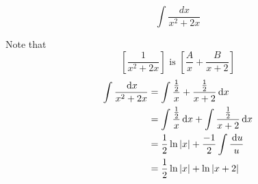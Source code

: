 \begin{ex}
  \[ \int \frac{dx}{x^2+2x} \]
  \begin{sol}
    Note that
    \[ \left[ \frac{1}{x^2+2x}\right] \text{ is }
    \left[\frac{A}{x}+\frac{B}{x+2}\right] \]
    \begin{align*}
      \int \frac{\,\mathrm{d} x}{x^2+2x} &=
      \int \frac{\frac{1}{2}}{x}+\frac{\frac{1}{2}}{x+2} \,\mathrm{d} x \\
      &= \int \frac{\frac{1}{2}}{x} \,\mathrm{d} x+\int\frac{\frac{1}{2}}{x+2} \,\mathrm{d} x \\
      &= \frac{1}{2}\ln{|x|}+\frac{-1}{2}\int\frac{\,\mathrm{d} u}{u} \\
      &= \frac{1}{2}\ln{|x|}+\ln{|x+2|}
    \end{align*}
  \end{sol}
\end{ex}

